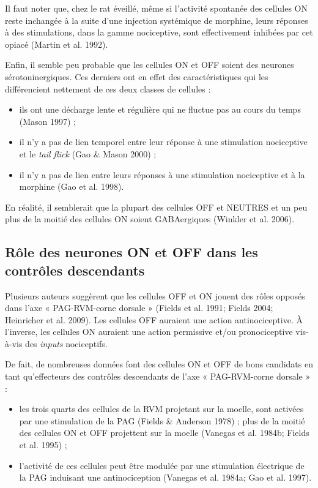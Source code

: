\documentclass[a4paper,12pt,twoside]{report}
\begin{document}
Il faut noter que, chez le rat éveillé, même si l’activité spontanée des cellules ON reste inchangée à la suite d’une injection systémique de morphine, leurs réponses à des stimulations, dans la gamme nociceptive, sont effectivement inhibées par cet opiacé (Martin et al. 1992).

Enfin, il semble peu probable que les cellules ON et OFF soient des neurones sérotoninergiques. Ces derniers ont en effet des caractéristiques qui les différencient nettement de ces deux classes de cellules : 

\begin{itemize}
\item ils ont une décharge lente et régulière qui ne fluctue pas au cours du temps (Mason 1997) ;
\item il n’y a pas de lien temporel entre leur réponse à une stimulation nociceptive et le \textit{tail flick} (Gao \& Mason 2000) ;
\item il n’y a pas de lien entre leurs réponses à une stimulation nociceptive et à la morphine (Gao et al. 1998). 
\end{itemize}

En réalité, il semblerait que la plupart des cellules OFF et NEUTRES et un peu plus de la moitié des cellules ON soient GABAergiques (Winkler et al. 2006).

\subsection{Rôle des neurones ON et OFF dans les contrôles descendants}

Plusieurs auteurs suggèrent que les cellules OFF et ON jouent des rôles opposés dans l’axe « PAG-RVM-corne dorsale » (Fields et al. 1991; Fields 2004; Heinricher et al. 2009). Les cellules OFF auraient une action antinociceptive. À l’inverse, les cellules ON auraient une action permissive et/ou pronociceptive vis-à-vis des \textit{inputs} nociceptifs.
 
De fait, de nombreuses données font des cellules ON et OFF de bons candidats en tant qu’effecteurs des contrôles descendants de l’axe « PAG-RVM-corne dorsale » :

\begin{itemize}
\item les trois quarts des cellules de la RVM projetant sur la moelle, sont activées par une stimulation de la PAG (Fields \& Anderson 1978) ;
plus de la moitié des cellules ON et OFF projettent sur la moelle (Vanegas et al. 1984b; Fields et al. 1995) ; 
\item l’activité de ces cellules peut être modulée par une stimulation électrique de la PAG induisant une antinociception (Vanegas et al. 1984a; Gao et al. 1997). 
\end{itemize}
\end{document}
